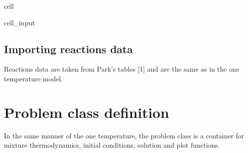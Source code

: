 \documentclass[letterpaper,10pt,english]{jupyterBook}
\begin{document}
\begin{sphinxuseclass}{cell}\begin{sphinxVerbatimInput}

\begin{sphinxuseclass}{cell_input}
\begin{sphinxVerbatim}[commandchars=\\\{\}]
 
       
          \PYG{p}{[}\PYG{p}{]}
                     
                 
    
    
      
              
          
\end{sphinxVerbatim}

\end{sphinxuseclass}\end{sphinxVerbatimInput}

\end{sphinxuseclass}

\section{Importing reactions data}
\label{\detokenize{2_Temperature/_2T_Reaction_class_definition:importing-reactions-data}}
\sphinxAtStartPar
Reactions data are taken from Park’s tables {[}1{]} and are the same as in the one temperature model.


\chapter{Problem class definition}
\label{\detokenize{2_Temperature/_2T_Problem_class_definition:problem-class-definition}}\label{\detokenize{2_Temperature/_2T_Problem_class_definition::doc}}
\sphinxAtStartPar
In the same manner of the one temperature, the problem class is a container for mixture thermodynamics, initial conditions, solution and plot functions.
\end{document}
